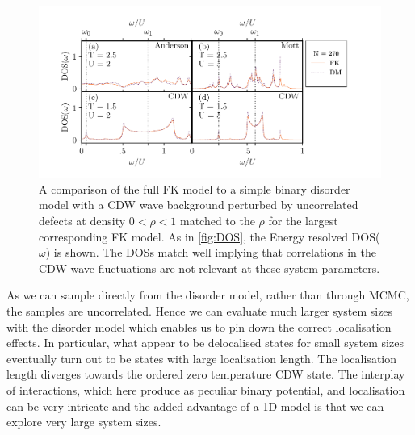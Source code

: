 \hypertarget{fig:DM_DOS}{%
\begin{figure}
\centering
\includegraphics[width=1\textwidth,height=\textheight]{figure_code/fk_chapter/disorder_model/DM_DOS}
\caption[{FK model compared to binary disorder model: DOS}]{A comparison of the full FK model to a simple binary disorder model with a CDW wave background perturbed by uncorrelated defects at density \(0 < \rho < 1\) matched to the \(\rho\) for the largest corresponding FK model. As in \cref{fig:DOS}, the Energy resolved DOS(\(\omega\)) is shown. The DOSs match well implying that correlations in the CDW wave fluctuations are not relevant at these system parameters.}
\label{fig:DM_DOS}
\end{figure}
}

As we can sample directly from the disorder model, rather than through MCMC, the samples are uncorrelated. Hence we can evaluate much larger system sizes with the disorder model which enables us to pin down the correct localisation effects. In particular, what appear to be delocalised states for small system sizes eventually turn out to be states with large localisation length. The localisation length diverges towards the ordered zero temperature CDW state. The interplay of interactions, which here produce as peculiar binary potential, and localisation can be very intricate and the added advantage of a 1D model is that we can explore very large system sizes.

